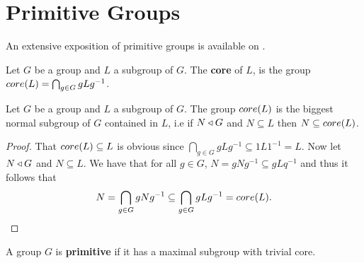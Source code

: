 \section{Primitive Groups}

An extensive exposition of primitive groups is available on \cite{Ballester-BolinchesCFG}.

\begin{definition}
    Let $G$ be a group and $L$ a subgroup of $G$. The \textbf{core} of $L$, is the group $core({L}) = \bigcap_{g \in G} gLg^{-1}$.  
\end{definition}

\begin{theorem}
    Let $G$ be a group and $L$ a subgroup of $G$. The group $core({L})$ is the biggest normal subgroup of $G$ contained in $L$, i.e if $N \triangleleft G$ and $N \subseteq L$ then $N \subseteq core({L})$.
\end{theorem}

\begin{proof}
    That $core({L}) \subseteq L$ is obvious since $\bigcap_{g \in G} gLg^{-1} \subseteq 1L1^{-1} = L$. Now let $N \triangleleft G$ and $N \subseteq L$. We have that for all $g \in G$, $N = gNg^{-1} \subseteq gLq^{-1}$ and thus it follows that 
    $$
    N = \bigcap_{g \in G} gNg^{-1} \subseteq \bigcap_{g \in G} gLg^{-1} = core({L}).
    $$
\end{proof}

\begin{definition}
    A group $G$ is \textbf{primitive} if it has a maximal subgroup with trivial core.
\end{definition}